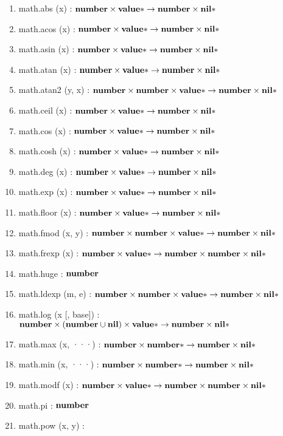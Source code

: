 \begin{enumerate}
\item math.abs (x) :
$\mathbf{number} \times \mathbf{value}{*} \rightarrow \mathbf{number} \times \mathbf{nil}{*}$
\item math.acos (x) :
$\mathbf{number} \times \mathbf{value}{*} \rightarrow \mathbf{number} \times \mathbf{nil}{*}$
\item math.asin (x) :
$\mathbf{number} \times \mathbf{value}{*} \rightarrow \mathbf{number} \times \mathbf{nil}{*}$
\item math.atan (x) :
$\mathbf{number} \times \mathbf{value}{*} \rightarrow \mathbf{number} \times \mathbf{nil}{*}$
\item math.atan2 (y, x) :
$\mathbf{number} \times \mathbf{number} \times \mathbf{value}{*} \rightarrow \mathbf{number} \times \mathbf{nil}{*}$
\item math.ceil (x) :
$\mathbf{number} \times \mathbf{value}{*} \rightarrow \mathbf{number} \times \mathbf{nil}{*}$
\item math.cos (x) :
$\mathbf{number} \times \mathbf{value}{*} \rightarrow \mathbf{number} \times \mathbf{nil}{*}$
\item math.cosh (x) :
$\mathbf{number} \times \mathbf{value}{*} \rightarrow \mathbf{number} \times \mathbf{nil}{*}$  
\item math.deg (x) :
$\mathbf{number} \times \mathbf{value}{*} \rightarrow \mathbf{number} \times \mathbf{nil}{*}$
\item math.exp (x) :
$\mathbf{number} \times \mathbf{value}{*} \rightarrow \mathbf{number} \times \mathbf{nil}{*}$
\item math.floor (x) :
$\mathbf{number} \times \mathbf{value}{*} \rightarrow \mathbf{number} \times \mathbf{nil}{*}$
\item math.fmod (x, y) :
$\mathbf{number} \times \mathbf{number} \times \mathbf{value}{*} \rightarrow \mathbf{number} \times \mathbf{nil}{*}$
\item math.frexp (x) :
$\mathbf{number} \times \mathbf{value}{*} \rightarrow \mathbf{number} \times \mathbf{number} \times \mathbf{nil}{*}$
\item math.huge : $\mathbf{number}$
\item math.ldexp (m, e) :
$\mathbf{number} \times \mathbf{number} \times \mathbf{value}{*} \rightarrow \mathbf{number} \times \mathbf{nil}{*}$
\item math.log (x [, base]) :
$\mathbf{number} \times
(\mathbf{number} \cup \mathbf{nil}) \times
\mathbf{value}{*} \rightarrow
\mathbf{number} \times
\mathbf{nil}{*}$
\item math.max (x, ···) :
$\mathbf{number} \times \mathbf{number}{*} \rightarrow \mathbf{number} \times \mathbf{nil}{*}$
\item math.min (x, ···) :
$\mathbf{number} \times \mathbf{number}{*} \rightarrow \mathbf{number} \times \mathbf{nil}{*}$
\item math.modf (x) :
$\mathbf{number} \times \mathbf{value}{*} \rightarrow \mathbf{number} \times \mathbf{number} \times \mathbf{nil}{*}$
\item math.pi : $\mathbf{number}$
\item math.pow (x, y) :

\end{enumerate}
